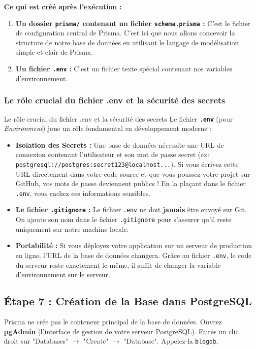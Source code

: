 \textbf{Ce qui est créé après l'exécution :}
\begin{enumerate}
    \item \textbf{Un dossier \texttt{prisma/} contenant un fichier \texttt{schema.prisma} :} C'est le fichier de configuration central de Prisma. C'est ici que nous allons concevoir la structure de notre base de données en utilisant le langage de modélisation simple et clair de Prisma.
    \item \textbf{Un fichier \texttt{.env} :} C'est un fichier texte spécial contenant nos variables d'environnement.
\end{enumerate}

\subsubsection{Le rôle crucial du fichier .env et la sécurité des secrets}

\begin{warningbox}{Le rôle crucial du fichier .env et la sécurité des secrets}
Le fichier \textbf{\texttt{.env}} (pour \textit{Environment}) joue un rôle fondamental en développement moderne :
\begin{itemize}
    \item \textbf{Isolation des Secrets :} Une base de données nécessite une URL de connexion contenant l'utilisateur et son mot de passe secret (ex: \texttt{postgresql://postgres:secret123@localhost...}). Si vous écrivez cette URL directement dans votre code source et que vous poussez votre projet sur GitHub, vos mots de passe deviennent publics ! En la plaçant dans le fichier \texttt{.env}, vous cachez ces informations sensibles.
    \item \textbf{Le fichier \texttt{.gitignore} :} Le fichier \texttt{.env} ne doit \textbf{jamais} être envoyé sur Git. On ajoute son nom dans le fichier \texttt{.gitignore} pour s'assurer qu'il reste uniquement sur notre machine locale.
    \item \textbf{Portabilité :} Si vous déployez votre application sur un serveur de production en ligne, l'URL de la base de données changera. Grâce au fichier \texttt{.env}, le code du serveur reste exactement le même, il suffit de changer la variable d'environnement sur le serveur.
\end{itemize}
\end{warningbox}

\subsection{Étape 7 : Création de la Base dans PostgreSQL}
Prisma ne crée pas le conteneur principal de la base de données.
Ouvrez \textbf{pgAdmin} (l'interface de gestion de votre serveur PostgreSQL). Faites un clic droit sur "Databases" $\rightarrow$ "Create" $\rightarrow$ "Database". Appelez-la \texttt{blogdb}.

